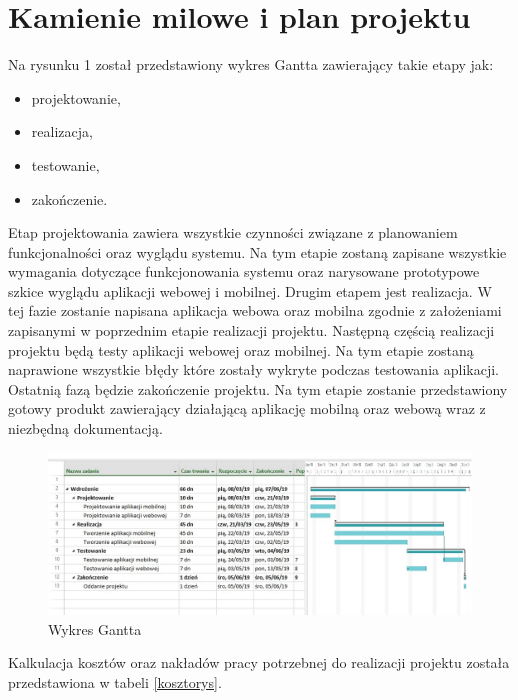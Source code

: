 \documentclass[12pt]{article}
\begin{document}
\newpage
\section{Kamienie milowe i plan projektu}

\noindent Na rysunku 1 został przedstawiony wykres Gantta zawierający takie etapy jak: 
\begin{itemize}
\item projektowanie,
\item realizacja,
\item testowanie,
\item zakończenie.
\end{itemize}

Etap projektowania zawiera wszystkie czynności związane z planowaniem funkcjonalności oraz wyglądu systemu. Na tym etapie zostaną zapisane wszystkie wymagania dotyczące funkcjonowania systemu oraz narysowane prototypowe szkice wyglądu aplikacji webowej i mobilnej.
Drugim etapem jest realizacja. W tej fazie zostanie napisana aplikacja webowa oraz mobilna zgodnie z założeniami zapisanymi w poprzednim etapie realizacji projektu. Następną częścią realizacji projektu będą testy aplikacji webowej oraz mobilnej.  Na tym etapie zostaną naprawione wszystkie błędy które zostały wykryte podczas testowania aplikacji. Ostatnią fazą będzie zakończenie projektu. Na tym etapie zostanie przedstawiony gotowy produkt zawierający działającą aplikację mobilną oraz webową wraz z niezbędną dokumentacją. 
	\begin{figure}[H]
		\centering
		\includegraphics[scale=0.75, angle=270]{wykres_ganttaV3.png}
		\caption{Wykres Gantta}
	\end{figure}
	

Kalkulacja kosztów oraz nakładów pracy potrzebnej do realizacji projektu została przedstawiona w tabeli \ref{kosztorys}.
\end{document}
